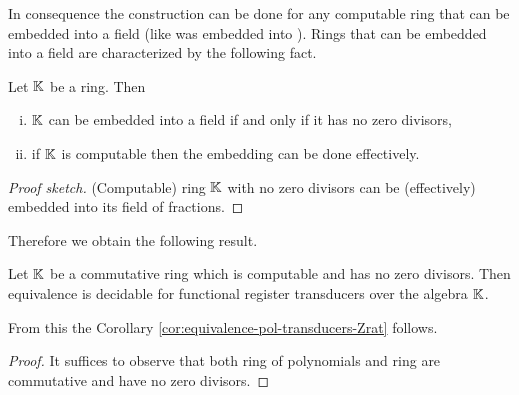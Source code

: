 In consequence the construction can be done for any computable ring that can be embedded into a field
(like \Z was embedded into \Q). Rings that can be embedded into a field are characterized by the following fact.
\begin{lemma}\label{lem:ring-with-no-zero-divisors-subring-of-a-field}
	Let ${\mathbb K}$ be a ring. Then
	\begin{enumerate}[(i)]
		\item ${\mathbb K}$ can be embedded into a field if and only if it has no zero divisors,
		\item if ${\mathbb K}$ is computable then the embedding can be done effectively.
	\end{enumerate}
\end{lemma}
\begin{proof}[Proof sketch]
	(Computable) ring ${\mathbb K}$ with no zero divisors can be (effectively) embedded into its field of fractions.
\end{proof}
Therefore we obtain the following result.
\begin{theorem}\label{thm:equivalence-polynomial-automata-over-a-ring}
	Let ${\mathbb K}$ be a commutative ring which is computable and has no zero divisors. Then equivalence is decidable for functional register transducers over the algebra ${\mathbb K}$.
\end{theorem}
From this the Corollary \ref{cor:equivalence-pol-transducers-Zrat} follows.
\corEquivPolTransducersZrat*
\begin{proof}%
It suffices to observe that both ring of polynomials and ring \Zrat are commutative and have no zero divisors.
\end{proof}
